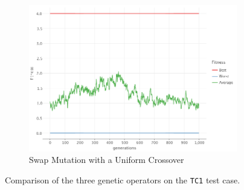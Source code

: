 \begin{figure}[ht!]
\begin{subfigure}{0.45\textwidth}
            \includegraphics[width=\textwidth]{img/beacon_uniform_swap_1.png}
            \caption{Swap Mutation with a Uniform Crossover}
            \label{fig:beacon:3:swap}
        \end{subfigure}
        \caption{Comparison of the three genetic operators on the \texttt{TC1} test case.}
        \label{fig:beacon:3}
    \end{figure}

